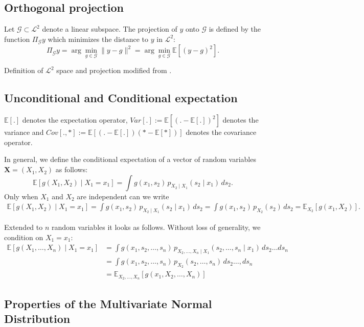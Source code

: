 \subsection*{Orthogonal projection}
Let $\mathcal{G} \subset \mathcal{L}^2$ denote a linear subspace. The projection of $y$ onto $\mathcal{G}$ is defined by the function $\Pi_{\mathcal{G}}y$ which minimizes the distance to $y$ in $\mathcal{L}^2$:
\[
\Pi_{\mathcal{G}}y = \arg\min_{g \in \mathcal{G}} \|y - g\|^2
= \arg\min_{g \in \mathcal{G}} \mathbb{E}[(y - g)^2].
\]

Definition of $\mathcal{L}^2$ space and projection modified from \citealp{nagler2024linalg}.

\subsection*{Unconditional and Conditional expectation}
$\mathbb{E}[.]$ denotes the expectation operator, $Var[.] := \mathbb{E}[(. - \mathbb{E}[.])^2]$ denotes the variance and $Cov[.,*] := \mathbb{E}[(. - \mathbb{E}[.]) (* - \mathbb{E}[*])]$ denotes the covariance operator.\par
In general, we define the conditional expectation of a vector of random variables $\boldsymbol{X} = (X_1, X_2)$ as follows:
\[
\mathbb{E}[g(X_1, X_2) \mid X_1 = x_1] = \int g(x_1, s_2) \, p_{X_2 \mid X_1}(s_2 \mid x_1) \, ds_2.
\]
Only when $X_1$ and $X_2$ are independent can we write
\begin{align*}
    \mathbb{E}[g(X_1, X_2) \mid X_1 = x_1] = \int g(x_1, s_2) \, p_{X_2 \mid X_1}(s_2 \mid x_1) \, ds_2 = \int g(x_1, s_2) \, p_{X_2}(s_2) \, ds_2 = \mathbb{E}_{X_2}[g(x_1, X_2)].
\end{align*}

Extended to $n$ random variables it looks as follows. Without loss of generality, we condition on $X_1 = x_1$:
\begin{align*}
    \mathbb{E}[g(X_1, \dots, X_n) \mid X_1 = x_1] &= \int g(x_1, s_2, \dots, s_n) \, p_{X_2, \dots, X_n \mid X_1}(s_2, \dots, s_n \mid x_1) \, ds_2 \dots ds_n \\
    &= \int g(x_1, s_2, \dots, s_n) \, p_{X_2}(s_2, \dots, s_n) \, ds_2 \dots, ds_n \\
    &= \mathbb{E}_{X_2, \dots, X_n}[g(x_1, X_2, \dots, X_n)]
\end{align*}



\subsection*{Properties of the Multivariate Normal Distribution}

